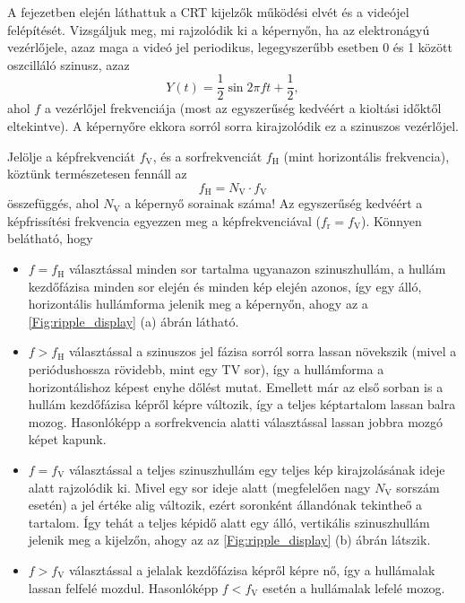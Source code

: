 A fejezetben elején láthattuk a CRT kijelzők működési elvét és a videójel felépítését.
Vizsgáljuk meg, mi rajzolódik ki a képernyőn, ha az elektronágyú vezérlőjele, azaz maga a videó jel periodikus, legegyszerűbb esetben 0 és 1 között oszcilláló szinusz, azaz
\begin{equation}
Y(t) = \frac{1}{2} \sin 2 \pi f t + \frac{1}{2},
\end{equation}
ahol $f$ a vezérlőjel frekvenciája (most az egyszerűség kedvéért a kioltási időktől eltekintve).
A képernyőre ekkora sorról sorra kirajzolódik ez a szinuszos vezérlőjel.

Jelölje a képfrekvenciát $f_\mathrm{V}$, és a sorfrekvenciát $f_\mathrm{H}$ (mint horizontális frekvencia), köztünk természetesen fennáll az
\begin{equation}
f_\mathrm{H} = N_\mathrm{V} \cdot f_\mathrm{V}
\end{equation}
összefüggés, ahol $N_\mathrm{V}$ a képernyő sorainak száma!
Az egyszerűség kedvéért a képfrissítési frekvencia egyezzen meg a képfrekvenciával ($f_\mathrm{r} = f_\mathrm{V}$).
Könnyen belátható, hogy 
\begin{itemize}
\item $f = f_\mathrm{H}$ választással minden sor tartalma ugyanazon szinuszhullám, a hullám kezdőfázisa minden sor elején és minden kép elején azonos, így egy álló, horizontális hullámforma jelenik meg a képernyőn, ahogy az a \ref{Fig:ripple_display} (a) ábrán látható.
\item $f > f_\mathrm{H}$ választással a szinuszos jel fázisa sorról sorra lassan növekszik (mivel a periódushossza rövidebb, mint egy TV sor), így a hullámforma a horizontálishoz képest enyhe dőlést mutat.
Emellett már az első sorban is a hullám kezdőfázisa képről képre változik, így a teljes képtartalom lassan balra mozog.
Hasonlóképp a sorfrekvencia alatti választással lassan jobbra mozgó képet kapunk.
\item $f = f_\mathrm{V}$ választással a teljes szinuszhullám egy teljes kép kirajzolásának ideje alatt rajzolódik ki.
Mivel egy sor ideje alatt (megfelelően nagy $N_\mathrm{V}$ sorszám esetén) a jel értéke alig változik, ezért soronként állandónak tekintheő a tartalom.
Így tehát a teljes képidő alatt egy álló, vertikális szinuszhullám jelenik meg a kijelzőn, ahogy az az \ref{Fig:ripple_display} (b) ábrán látszik.
\item $f > f_\mathrm{V}$ választással a jelalak kezdőfázisa képről képre nő, így a hullámalak lassan felfelé mozdul.
Hasonlóképp $f < f_\mathrm{V}$ esetén a hullámalak lefelé mozog.
\end{itemize}
